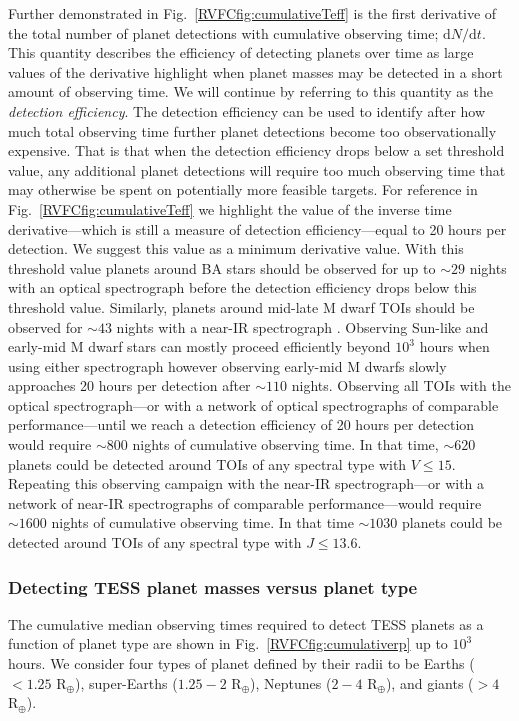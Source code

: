 Further demonstrated in Fig.~\ref{RVFCfig:cumulativeTeff} is the first derivative of the total number of
planet detections with cumulative observing time; $\text{d}N/\text{d}t$.
This quantity describes the efficiency of detecting planets over
time as large values of the derivative highlight when planet masses may be detected in a short amount of observing
time. We will continue by referring to this quantity as the \emph{detection efficiency}. The detection efficiency
can be used to identify after how much total
observing time further planet detections become too observationally expensive. That is that when the detection
efficiency drops below a set threshold value, any additional planet detections will require too much
observing time that may otherwise be spent on potentially more feasible targets.
For reference in Fig.~\ref{RVFCfig:cumulativeTeff}
we highlight the value of the inverse time derivative---which is still a measure of detection efficiency---equal
to 20 hours per detection. We suggest this value as a minimum
derivative value. With this threshold value planets around BA stars should be observed for up to $\sim 29$ nights 
with an optical spectrograph before the detection efficiency drops below this threshold value.
Similarly, planets around mid-late M dwarf TOIs should be observed for $\sim 43$ nights
with a near-IR spectrograph . Observing Sun-like and early-mid M dwarf stars can mostly proceed efficiently beyond
$10^3$ hours when using either spectrograph however observing early-mid M dwarfs slowly approaches 20 hours per
detection after $\sim 110$ nights.
Observing all TOIs with the optical spectrograph---or with a network of optical spectrographs of
comparable performance---until we reach a detection efficiency of
20 hours per detection would require $\sim 800$ nights of cumulative observing time.
In that time, $\sim 620$ planets could be detected around TOIs of any spectral type with $V \leq 15$.
Repeating this observing campaign with the near-IR
spectrograph---or with a network of near-IR spectrographs of comparable performance---would require $\sim 1600$ nights
of cumulative observing time. In that time $\sim 1030$ planets could be detected around TOIs
of any spectral type with $J \leq 13.6$.

\subsubsection{Detecting TESS planet masses versus planet type}
The cumulative median observing times required to detect TESS planets as a function of planet type 
are shown in Fig.~\ref{RVFCfig:cumulativerp} up to $10^3$ hours. We consider four types of planet defined by their radii to
be Earths ($<1.25$ R$_{\oplus}$), super-Earths ($1.25-2$ R$_{\oplus}$), Neptunes ($2-4$ R$_{\oplus}$),
and giants ($>4$ R$_{\oplus}$). \\


